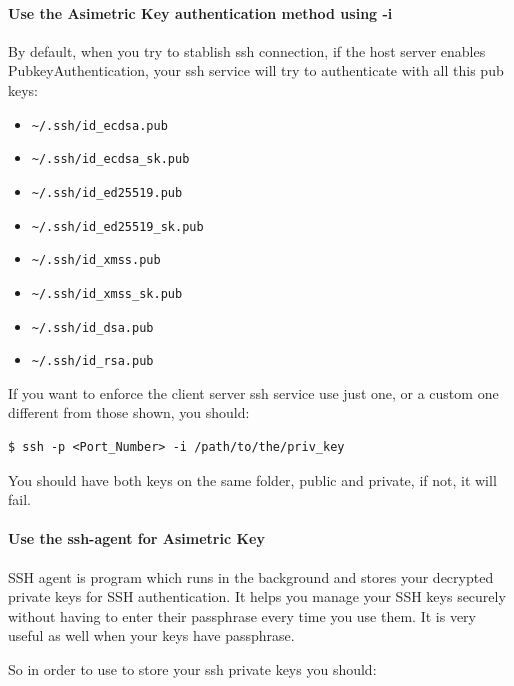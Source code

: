 \documentclass{article}
\newenvironment{blocktemplate}[1]{%
    \tcolorbox[beamer,%
    noparskip,breakable,
    colframe=Blue,%
    colbacklower=LimeGreen!75!LightGreen,%
    title=#1]}%
    {\endtcolorbox}
\newenvironment{codetemplate}[1][]{%
  \mybasecolorbox[#1]
  \itshape
}{%
  \endmybasecolorbox
}
\begin{document}
\paragraph{Use the Asimetric Key authentication method using -i}

By default, when you try to stablish ssh connection, if the host server enables PubkeyAuthentication, your ssh service will try to authenticate with all this pub keys:
\begin{itemize}
    \item \verb|~/.ssh/id_ecdsa.pub|
    \item \verb|~/.ssh/id_ecdsa_sk.pub|
    \item \verb|~/.ssh/id_ed25519.pub|
    \item \verb|~/.ssh/id_ed25519_sk.pub|
    \item \verb|~/.ssh/id_xmss.pub|
    \item \verb|~/.ssh/id_xmss_sk.pub|
    \item \verb|~/.ssh/id_dsa.pub|
    \item \verb|~/.ssh/id_rsa.pub|
\end{itemize}

If you want to enforce the client server ssh service use just one, or a custom one different from those shown, you should:
\begin{codetemplate}{}
\begin{verbatim}
$ ssh -p <Port_Number> -i /path/to/the/priv_key
\end{verbatim}
\end{codetemplate}

\begin{blocktemplate}{NOTE}
You should have both keys on the same folder, public and private, if not, it will fail.
\end{blocktemplate}

\paragraph{Use the ssh-agent for Asimetric Key}

SSH agent is program which runs in the background and stores your decrypted private keys for SSH authentication. It helps you manage your SSH keys securely without having to enter their passphrase every time you use them. It is very useful as well when your keys have passphrase.

So in order to use to store your ssh private keys you should:
\end{document}
